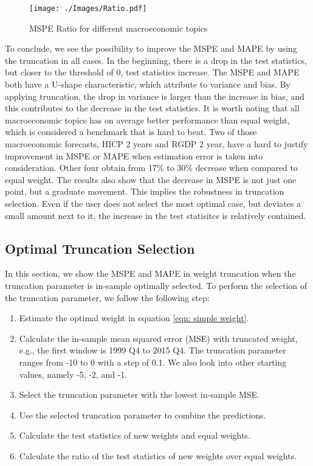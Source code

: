 \documentclass[11pt]{article}
\begin{document}
\begin{figure}[!h]
	\centering
	\texttt{[image: ./Images/Ratio.pdf]}
	\caption{MSPE Ratio for different macroeconomic topics}\label{fig: Ratio sub}
\end{figure}

To conclude, we see the possibility to improve the MSPE and MAPE by using the truncation in all cases. In the beginning, there is a drop in the test statistics, but closer to the threshold of 0, test statistics increase. The MSPE and MAPE both have a U-shape characteristic, which attribute to variance and bias. By applying truncation, the drop in variance is larger than the increase in bias, and this contributes to the decrease in the test statistics. It is worth noting that all macroeconomic topics has on average better performance than equal weight, which is considered a benchmark that is hard to beat. Two of those  macroeconomic forecasts, HICP 2 years and RGDP 2 year, have a hard to justify improvement in MSPE or MAPE when estimation error is taken into consideration. Other four obtain from 17\% to 30\% decrease when compared to equal weight. The results also show that the decrease in MSPE is not just one point, but a graduate movement. This implies the robustness in truncation selection. Even if the user does not select the most optimal case, but deviates a small amount next to it, the increase in the test statisitcs is relatively contained.

\subsection{Optimal Truncation Selection}\label{out-of-sample-truncation-selection}

In this section, we show the MSPE and MAPE in weight truncation when
the truncation parameter is in-sample optimally selected. To perform the
selection of the truncation parameter, we follow the following step:

\begin{enumerate}
	\def\labelenumi{\arabic{enumi}.}
	\item
	Estimate the optimal weight in equation \ref{eqn: simple weight}.
	\item
	Calculate the in-sample mean squared error (MSE) with truncated weight, e.g., the first window is 1999 Q4 to 2015 Q4. The
	truncation parameter ranges from -10 to 0 with a step of 0.1. We also look into other starting values, namely -5, -2, and -1.
	\item
	Select the truncation parameter with the lowest in-sample MSE.
	\item
	Use the selected truncation parameter to combine the predictions.
	\item
	Calculate the test statistics of new weights and equal weights.
	\item
	Calculate the ratio of the test statistics of new weights over equal weights.
\end{enumerate}
\end{document}
